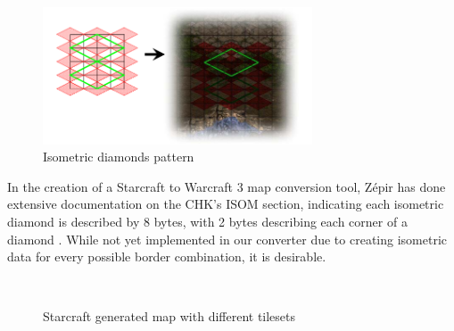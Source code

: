 \documentclass[letterpaper]{article}
\begin{document}
\begin{figure}[ht]
    \centering
    \includegraphics[width=8cm]{iso-diamonds.png}
    \caption{Isometric diamonds pattern}
    \label{fig:iso-diamonds}
\end{figure}

In the creation of a Starcraft to Warcraft 3 map conversion tool, Z\'{e}pir has done extensive documentation on the CHK's ISOM section, indicating each isometric diamond is described by 8 bytes, with 2 bytes describing each corner of a diamond \cite{Zepir}. While not yet implemented in our converter due to creating isometric data for every possible border combination, it is desirable.

\begin{figure}[ht]
  \centering
  ~ %
  ~ %
  \caption{Starcraft generated map with different tilesets}
  \label{fig:final-maps}
\end{figure}
\end{document}
